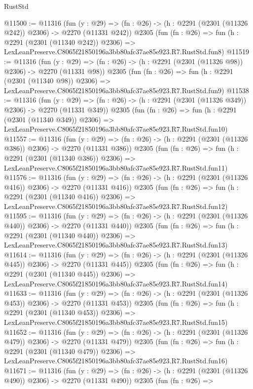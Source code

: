 \begin{lexlean}{RustStd}
\begin{coremodule}
@11500 := @11316
    (fun (y : @29) => (fn : @26) -> (h : @2291 (@2301 (@11326 @242)) @2306) -> @2270 (@11331 @242))
    @2305
    (fun (fn : @26) =>
    fun (h : @2291 (@2301 (@11340 @242)) @2306) =>
    LexLeanPreserve.C8065f21850196a3bb80afc37ae85e923.R7.RustStd.fun8)
@11519 := @11316
    (fun (y : @29) => (fn : @26) -> (h : @2291 (@2301 (@11326 @98)) @2306) -> @2270 (@11331 @98))
    @2305
    (fun (fn : @26) =>
    fun (h : @2291 (@2301 (@11340 @98)) @2306) =>
    LexLeanPreserve.C8065f21850196a3bb80afc37ae85e923.R7.RustStd.fun9)
@11538 := @11316
    (fun (y : @29) => (fn : @26) -> (h : @2291 (@2301 (@11326 @349)) @2306) -> @2270 (@11331 @349))
    @2305
    (fun (fn : @26) =>
    fun (h : @2291 (@2301 (@11340 @349)) @2306) =>
    LexLeanPreserve.C8065f21850196a3bb80afc37ae85e923.R7.RustStd.fun10)
@11557 := @11316
    (fun (y : @29) => (fn : @26) -> (h : @2291 (@2301 (@11326 @386)) @2306) -> @2270 (@11331 @386))
    @2305
    (fun (fn : @26) =>
    fun (h : @2291 (@2301 (@11340 @386)) @2306) =>
    LexLeanPreserve.C8065f21850196a3bb80afc37ae85e923.R7.RustStd.fun11)
@11576 := @11316
    (fun (y : @29) => (fn : @26) -> (h : @2291 (@2301 (@11326 @416)) @2306) -> @2270 (@11331 @416))
    @2305
    (fun (fn : @26) =>
    fun (h : @2291 (@2301 (@11340 @416)) @2306) =>
    LexLeanPreserve.C8065f21850196a3bb80afc37ae85e923.R7.RustStd.fun12)
@11595 := @11316
    (fun (y : @29) => (fn : @26) -> (h : @2291 (@2301 (@11326 @440)) @2306) -> @2270 (@11331 @440))
    @2305
    (fun (fn : @26) =>
    fun (h : @2291 (@2301 (@11340 @440)) @2306) =>
    LexLeanPreserve.C8065f21850196a3bb80afc37ae85e923.R7.RustStd.fun13)
@11614 := @11316
    (fun (y : @29) => (fn : @26) -> (h : @2291 (@2301 (@11326 @445)) @2306) -> @2270 (@11331 @445))
    @2305
    (fun (fn : @26) =>
    fun (h : @2291 (@2301 (@11340 @445)) @2306) =>
    LexLeanPreserve.C8065f21850196a3bb80afc37ae85e923.R7.RustStd.fun14)
@11633 := @11316
    (fun (y : @29) => (fn : @26) -> (h : @2291 (@2301 (@11326 @453)) @2306) -> @2270 (@11331 @453))
    @2305
    (fun (fn : @26) =>
    fun (h : @2291 (@2301 (@11340 @453)) @2306) =>
    LexLeanPreserve.C8065f21850196a3bb80afc37ae85e923.R7.RustStd.fun15)
@11652 := @11316
    (fun (y : @29) => (fn : @26) -> (h : @2291 (@2301 (@11326 @479)) @2306) -> @2270 (@11331 @479))
    @2305
    (fun (fn : @26) =>
    fun (h : @2291 (@2301 (@11340 @479)) @2306) =>
    LexLeanPreserve.C8065f21850196a3bb80afc37ae85e923.R7.RustStd.fun16)
@11671 := @11316
    (fun (y : @29) => (fn : @26) -> (h : @2291 (@2301 (@11326 @490)) @2306) -> @2270 (@11331 @490))
    @2305
    (fun (fn : @26) =>

\end{coremodule}
\end{lexlean}
